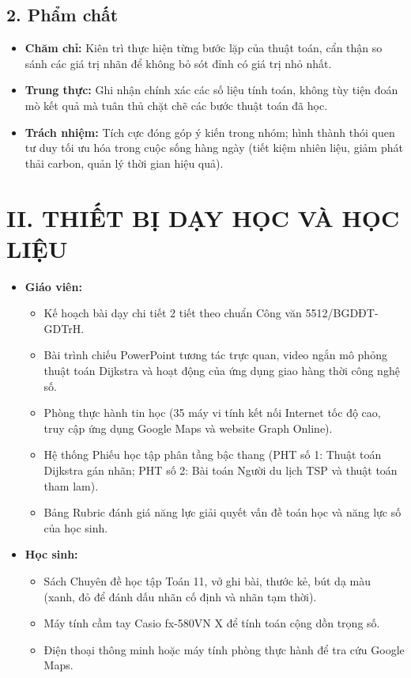\documentclass[12pt, a4paper]{article}
\begin{document}
\subsection*{2. Phẩm chất}

\begin{itemize}[leftmargin=1.2cm]
    \item \textbf{Chăm chỉ:} Kiên trì thực hiện từng bước lặp của thuật toán, cẩn thận so sánh các giá trị nhãn để không bỏ sót đỉnh có giá trị nhỏ nhất.
    \item \textbf{Trung thực:} Ghi nhận chính xác các số liệu tính toán, không tùy tiện đoán mò kết quả mà tuân thủ chặt chẽ các bước thuật toán đã học.
    \item \textbf{Trách nhiệm:} Tích cực đóng góp ý kiến trong nhóm; hình thành thói quen tư duy tối ưu hóa trong cuộc sống hàng ngày (tiết kiệm nhiên liệu, giảm phát thải carbon, quản lý thời gian hiệu quả).
\end{itemize}

\section*{II. THIẾT BỊ DẠY HỌC VÀ HỌC LIỆU}

\begin{itemize}[leftmargin=1.2cm]
    \item \textbf{Giáo viên:}
    \begin{itemize}[leftmargin=0.6cm]
        \item Kế hoạch bài dạy chi tiết 2 tiết theo chuẩn Công văn 5512/BGDĐT-GDTrH.
        \item Bài trình chiếu PowerPoint tương tác trực quan, video ngắn mô phỏng thuật toán Dijkstra và hoạt động của ứng dụng giao hàng thời công nghệ số.
        \item Phòng thực hành tin học (35 máy vi tính kết nối Internet tốc độ cao, truy cập ứng dụng Google Maps và website Graph Online).
        \item Hệ thống Phiếu học tập phân tầng bậc thang (PHT số 1: Thuật toán Dijkstra gán nhãn; PHT số 2: Bài toán Người du lịch TSP và thuật toán tham lam).
        \item Bảng Rubric đánh giá năng lực giải quyết vấn đề toán học và năng lực số của học sinh.
    \end{itemize}

    \item \textbf{Học sinh:}
    \begin{itemize}[leftmargin=0.6cm]
        \item Sách Chuyên đề học tập Toán 11, vở ghi bài, thước kẻ, bút dạ màu (xanh, đỏ để đánh dấu nhãn cố định và nhãn tạm thời).
        \item Máy tính cầm tay Casio fx-580VN X để tính toán cộng dồn trọng số.
        \item Điện thoại thông minh hoặc máy tính phòng thực hành để tra cứu Google Maps.
    \end{itemize}
\end{itemize}
\end{document}
